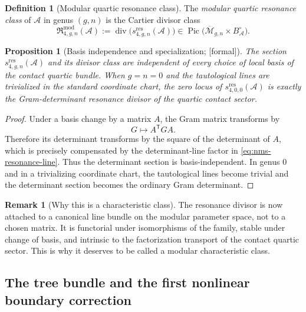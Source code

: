 \documentclass[11pt,oneside]{memoir}
\numberwithin{equation}{chapter}
\newtheorem{proposition}[theorem]{Proposition}
\theoremstyle{definition}
\newtheorem{definition}[theorem]{Definition}
\newtheorem{remark}[theorem]{Remark}
\newcommand{\ClaimStatusProvedHere}{\textnormal{[formal]}}
\newcommand{\cA}{\mathcal A}
\begin{document}
\begin{definition}[Modular quartic resonance class]
\label{def:nms-modular-quartic-resonance-class}
The \emph{modular quartic resonance class} of $\cA$ in genus $(g,n)$ is the Cartier divisor class
\begin{equation}
\label{eq:nms-modular-resonance-class}
\mathfrak R_{4,g,n}^{\mathrm{mod}}(\cA)
:=
\operatorname{div}\bigl(s_{4,g,n}^{\mathrm{res}}(\cA)\bigr)
\in
\operatorname{Pic}\bigl(\overline{\mathcal M}_{g,n}\times B_{\cA}^{\circ}\bigr).
\end{equation}
\end{definition}

\begin{proposition}[Basis independence and specialization; \ClaimStatusProvedHere]
\label{prop:nms-basis-independence-specialization}
The section $s_{4,g,n}^{\mathrm{res}}(\cA)$ and its divisor class are independent of every choice of local basis of the contact quartic bundle.  When $g=n=0$ and the tautological lines are trivialized in the standard coordinate chart, the zero locus of $s_{4,0,0}^{\mathrm{res}}(\cA)$ is exactly the Gram-determinant resonance divisor of the quartic contact sector.
\end{proposition}

\begin{proof}
Under a basis change by a matrix $A$, the Gram matrix transforms by
\[
G\longmapsto A^{\mathsf T}GA.
\]
Therefore its determinant transforms by the square of the determinant of $A$, which is precisely compensated by the determinant-line factor in \eqref{eq:nms-resonance-line}.  Thus the determinant section is basis-independent.  In genus $0$ and in a trivializing coordinate chart, the tautological lines become trivial and the determinant section becomes the ordinary Gram determinant.\qedhere
\end{proof}

\begin{remark}[Why this is a characteristic class]
\label{rem:nms-why-characteristic-class}
The resonance divisor is now attached to a canonical line bundle on the modular parameter space, not to a chosen matrix.  It is functorial under isomorphisms of the family, stable under change of basis, and intrinsic to the factorization transport of the contact quartic sector.  This is why it deserves to be called a modular characteristic class.
\end{remark}

\subsection{The tree bundle and the first nonlinear boundary correction}
\label{subsec:nms-tree-bundle}
\end{document}
